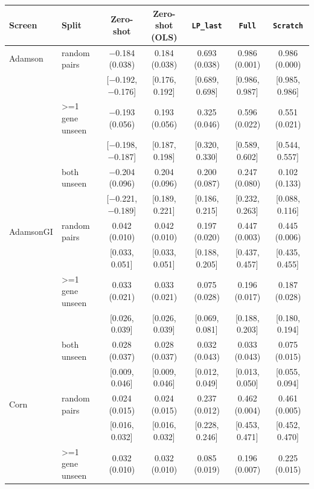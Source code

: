 \begin{tabular}{ll|ccccc}
\hline
Screen & Split & Zero-shot & Zero-shot (OLS) & \texttt{LP\_last} & \texttt{Full} & \texttt{Scratch} \\
\hline
Adamson & random pairs & $-$0.184 (0.038) & 0.184 (0.038) & 0.693 (0.038) & 0.986 (0.001) & 0.986 (0.000) \\
 & & \scriptsize[$-$0.192, $-$0.176] & \scriptsize[0.176, 0.192] & \scriptsize[0.689, 0.698] & \scriptsize[0.986, 0.987] & \scriptsize[0.985, 0.986] \\
 & >=1 gene unseen & $-$0.193 (0.056) & 0.193 (0.056) & 0.325 (0.046) & 0.596 (0.022) & 0.551 (0.021) \\
 & & \scriptsize[$-$0.198, $-$0.187] & \scriptsize[0.187, 0.198] & \scriptsize[0.320, 0.330] & \scriptsize[0.589, 0.602] & \scriptsize[0.544, 0.557] \\
 & both unseen & $-$0.204 (0.096) & 0.204 (0.096) & 0.200 (0.087) & 0.247 (0.080) & 0.102 (0.133) \\
 & & \scriptsize[$-$0.221, $-$0.189] & \scriptsize[0.189, 0.221] & \scriptsize[0.186, 0.215] & \scriptsize[0.232, 0.263] & \scriptsize[0.088, 0.116] \\
\hline
AdamsonGI & random pairs & 0.042 (0.010) & 0.042 (0.010) & 0.197 (0.020) & 0.447 (0.003) & 0.445 (0.006) \\
 & & \scriptsize[0.033, 0.051] & \scriptsize[0.033, 0.051] & \scriptsize[0.188, 0.205] & \scriptsize[0.437, 0.457] & \scriptsize[0.435, 0.455] \\
 & >=1 gene unseen & 0.033 (0.021) & 0.033 (0.021) & 0.075 (0.028) & 0.196 (0.017) & 0.187 (0.028) \\
 & & \scriptsize[0.026, 0.039] & \scriptsize[0.026, 0.039] & \scriptsize[0.069, 0.081] & \scriptsize[0.188, 0.203] & \scriptsize[0.180, 0.194] \\
 & both unseen & 0.028 (0.037) & 0.028 (0.037) & 0.032 (0.043) & 0.033 (0.043) & 0.075 (0.015) \\
 & & \scriptsize[0.009, 0.046] & \scriptsize[0.009, 0.046] & \scriptsize[0.012, 0.049] & \scriptsize[0.013, 0.050] & \scriptsize[0.055, 0.094] \\
\hline
Corn & random pairs & 0.024 (0.015) & 0.024 (0.015) & 0.237 (0.012) & 0.462 (0.004) & 0.461 (0.005) \\
 & & \scriptsize[0.016, 0.032] & \scriptsize[0.016, 0.032] & \scriptsize[0.228, 0.246] & \scriptsize[0.453, 0.471] & \scriptsize[0.452, 0.470] \\
 & >=1 gene unseen & 0.032 (0.010) & 0.032 (0.010) & 0.085 (0.019) & 0.196 (0.007) & 0.225 (0.015) \\

\end{tabular}

